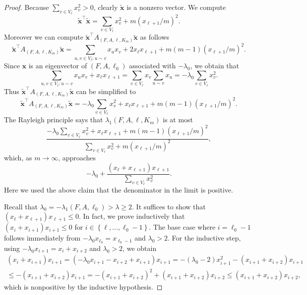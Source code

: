 \documentclass[10pt,a4paper]{amsart}
\newcommand{\bx}{\bm{x}}
\newcommand{\la}{\lambda}
\newcommand{\sset}[1]{\left\{{#1}\right\}}
\newcommand{\tbx}{\tilde{\bx}}
\begin{document}
\begin{proof}
    Because $\sum_{v \in V_\ell} x_v^2 > 0$, clearly $\tbx$ is a nonzero vector. We compute
    \[
        \tbx^\intercal \tbx = \sum_{v \in V_\ell}x_v^2 + m(x_{\ell + 1}/m)^2.
    \]
    Moreover we can compute $\tbx^\intercal A_{(F, A, \ell, K_m)} \tbx$ as follows
    \[
        \tbx^\intercal A_{(F, A, \ell, K_m)} \tbx = \sum_{u, v \in V_\ell\colon u \sim v} x_ux_v + 2x_\ell x_{\ell+1} + m(m-1)(x_{\ell+1}/m)^2.
    \]
    Since $\bx$ is an eigenvector of $(F, A, \ell_0)$ associated with $-\la_0$, we obtain that
    \[
        \sum_{u, v \in V_\ell\colon u \sim v} x_ux_v + x_\ell x_{\ell + 1} = \sum_{v \in V_\ell}x_v\sum_{u \sim v}x_u = -\la_0 \sum_{v \in V_\ell}x_v^2.
    \]
    Thus $\tbx^\intercal A_{(F, A, \ell, K_m)} \tbx$ can be simplified to
    \[
        \tbx^\intercal A_{(F, A, \ell, K_m)} \tbx = -\la_0 \sum_{v \in V_\ell}x_v^2 + x_\ell x_{\ell+1} + m(m-1)(x_{\ell+1}/m)^2.
    \]
    The Rayleigh principle says that $\la_1(F, A, \ell, K_m)$ is at most
    \[
        \frac{-\la_0 \sum_{v \in V_\ell} x_v^2 + x_\ell x_{\ell+1} + m(m-1)(x_{\ell+1}/m)^2}{\sum_{v \in V_\ell}x_v^2 + m(x_{\ell + 1}/m)^2},
    \]
    which, as $m \to \infty$, approaches
    \[
        -\la_0 + \frac{(x_\ell + x_{\ell+1})x_{\ell+1}}{\sum_{v \in V_\ell}x_v^2}.
    \]
    Here we used the above claim that the denominator in the limit is positive.
    
    Recall that $\la_0 = -\la_1(F, A, \ell_0) > \la \ge 2$. It suffices to show that $(x_\ell + x_{\ell+1})x_{\ell+1} \le 0$. In fact, we prove inductively that $(x_i + x_{i+1})x_{i+1} \le 0$ for $i \in \sset{\ell, \dots, \ell_0 - 1}$. The base case where $i = \ell_0 - 1$ follows immediately from $-\la_0x_{\ell_0} = x_{\ell_0-1}$ and $\la_0 > 2$. For the inductive step, using $-\la_0x_{i+1} = x_i + x_{i+2}$ and $\la_0 > 2$, we obtain
    \begin{multline*}
        (x_i + x_{i+1})x_{i+1} = (-\la_0x_{i+1} - x_{i+2} + x_{i+1})x_{i+1} = -(\la_0 - 2)x_{i+1}^2 - (x_{i+1}+x_{i+2})x_{i+1} \\
        \le -(x_{i+1}+x_{i+2})x_{i+1} = -(x_{i+1}+x_{i+2})^2 + (x_{i+1}+x_{i+2})x_{i+2} \le (x_{i+1}+x_{i+2})x_{i+2},
    \end{multline*}
    which is nonpositive by the inductive hypothesis.
\end{proof}
\end{document}
